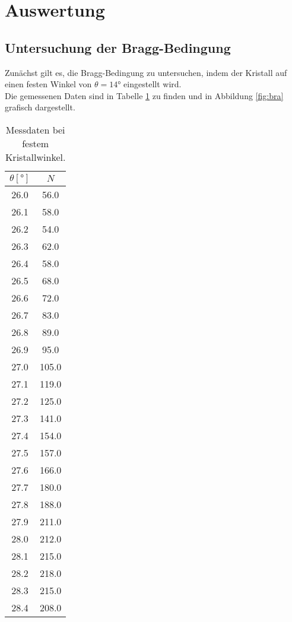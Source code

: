 \section{Auswertung}
\label{sec:Auswertung}

\subsection{Untersuchung der Bragg-Bedingung}
  Zunächst gilt es, die Bragg-Bedingung zu untersuchen, indem der Kristall auf einen festen Winkel von
  $\theta = 14°$ eingestellt wird.\\
  Die gemessenen Daten sind in Tabelle \ref{tab:bratab} zu finden und in Abbildung \ref{fig:bra} grafisch dargestellt.
  
  \begin{table}
    \centering
    \caption{Messdaten bei festem Kristallwinkel.}
    \label{tab:bratab}
    \begin{tabular}{c c}
      \toprule
      $\theta [°]$ & $N$ \\
      \midrule
      26.0	& 56.0\\
      26.1	& 58.0\\
      26.2	& 54.0\\
      26.3	& 62.0\\
      26.4	& 58.0\\
      26.5	& 68.0\\
      26.6	& 72.0\\
      26.7	& 83.0\\
      26.8	& 89.0\\
      26.9	& 95.0 \\      
      27.0	& 105.0 \\
      27.1	& 119.0 \\
      27.2	& 125.0 \\
      27.3	& 141.0 \\
      27.4	& 154.0 \\
      27.5	& 157.0 \\
      27.6	& 166.0 \\
      27.7	& 180.0 \\
      27.8	& 188.0 \\
      27.9	& 211.0 \\
      28.0	& 212.0 \\
      28.1	& 215.0 \\
      28.2	& 218.0 \\
      28.3	& 215.0 \\
      28.4	& 208.0 \\

\end{tabular}
\end{table}
